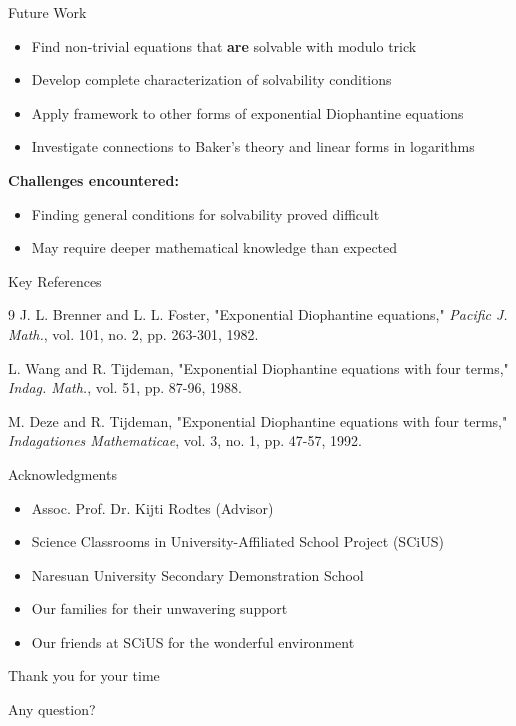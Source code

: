 \begin{frame}{Future Work}
    \begin{itemize}
        \item Find non-trivial equations that \textbf{are} solvable with modulo trick
        \item Develop complete characterization of solvability conditions
        \item Apply framework to other forms of exponential Diophantine equations
        \item Investigate connections to Baker's theory and linear forms in logarithms
    \end{itemize}

    \vspace{0.5cm}
    \textbf{Challenges encountered:}
    \begin{itemize}
        \item Finding general conditions for solvability proved difficult
        \item May require deeper mathematical knowledge than expected
    \end{itemize}
\end{frame}

\begin{frame}{Key References}
    \begin{thebibliography}{9}
         J. L. Brenner and L. L. Foster, "Exponential Diophantine equations," \textit{Pacific J. Math.}, vol. 101, no. 2, pp. 263-301, 1982.

         L. Wang and R. Tijdeman, "Exponential Diophantine equations with four terms," \textit{Indag. Math.}, vol. 51, pp. 87-96, 1988.

         M. Deze and R. Tijdeman, "Exponential Diophantine equations with four terms," \textit{Indagationes Mathematicae}, vol. 3, no. 1, pp. 47-57, 1992.
    \end{thebibliography}
\end{frame}

\begin{frame}{Acknowledgments}
    \Large
    \centering
    \begin{itemize}
        \item Assoc. Prof. Dr. Kijti Rodtes (Advisor)
        \item Science Classrooms in University-Affiliated School Project (SCiUS)
        \item Naresuan University Secondary Demonstration School
        \item Our families for their unwavering support
        \item Our friends at SCiUS for the wonderful environment
    \end{itemize}
\end{frame}

\begin{frame}
    \Huge
    \centering
    Thank you for your time

    \vspace{1cm}
    \Large
    Any question?
\end{frame}
